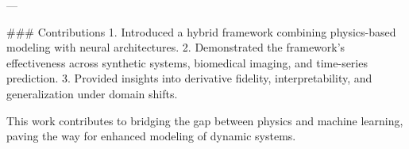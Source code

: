 ---

### Contributions  
1. Introduced a hybrid framework combining physics-based modeling with neural architectures.  
2. Demonstrated the framework’s effectiveness across synthetic systems, biomedical imaging, and time-series prediction.  
3. Provided insights into derivative fidelity, interpretability, and generalization under domain shifts.  

This work contributes to bridging the gap between physics and machine learning, paving the way for enhanced modeling of dynamic systems.  
